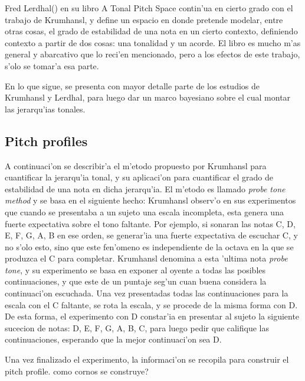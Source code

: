 
Fred Lerdhal(\cita) en su libro A Tonal Pitch Space contin'ua en cierto grado con el trabajo de Krumhansl, y define un espacio en donde pretende 
modelar, entre otras cosas, el grado de estabilidad de una nota en un cierto contexto, definiendo contexto a partir de dos cosas: una tonalidad y un acorde. 
El libro es mucho m'as general y abarcativo que lo reci'en mencionado, pero a los efectos de este trabajo, s'olo se tomar'a esa parte.

En lo que sigue, se presenta con mayor detalle parte de los estudios de Krumhansl y Lerdhal, para luego dar un marco bayesiano sobre el cual montar las jerarqu'ias tonales.

\subsection{Pitch profiles}
A continuaci'on se describir'a el m'etodo propuesto por Krumhansl para cuantificar la jerarqu'ia tonal, y su aplicaci'on para cuantificar el grado de estabilidad 
de una nota en dicha jerarqu'ia. 
El m'etodo es llamado \emph{probe tone method} y se basa en el siguiente hecho: Krumhansl observ'o en sus experimentos que cuando se presentaba a un sujeto una escala 
incompleta, esta genera una fuerte expectativa sobre el tono faltante. Por ejemplo, si sonaran las notas C, D, E, F, G, A, B en ese orden, se generar'ia una fuerte 
expectativa de escuchar C, y no s'olo esto, sino que este fen'omeno es independiente de la octava en la que se produzca el C para completar.
Krumhansl denomina a esta 'ultima nota \emph{probe tone}, y su experimento se basa en exponer al oyente a todas las posibles continuaciones, y que este de un puntaje
seg'un cuan buena considera la continuaci'on escuchada. Una vez presentadas todas las continuaciones para la escala con el C faltante, se rota la escala, y se procede
de la misma forma con D. De esta forma, el experimento con D constar'ia en presentar al sujeto la siguiente sucecion de notas: D, E, F, G, A, B, C, para luego pedir
que califique las continuaciones, esperando que la mejor continuaci'on sea D.

Una vez finalizado el experimento, la informaci'on se recopila para construir el pitch profile. \alert{como cornos se construye?}

